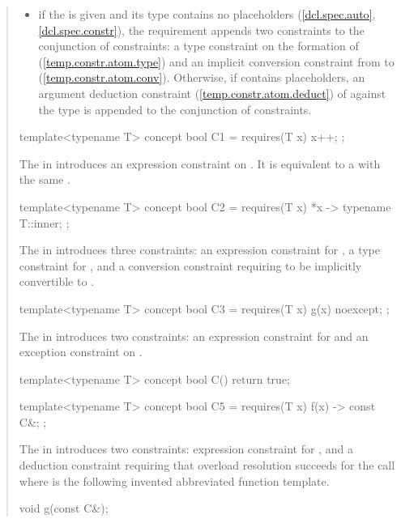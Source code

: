 \begin{quote}
\begin{itemize}
\item if the  is given and its 
type  contains no placeholders (\ref{dcl.spec.auto}, 
\ref{dcl.spec.constr}), the requirement appends two constraints to the 
conjunction of constraints:
a type constraint on the formation of  (\ref{temp.constr.atom.type}) and
an implicit conversion constraint from  to 
(\ref{temp.constr.atom.conv}).
%
Otherwise, if  contains placeholders, an argument deduction 
constraint (\ref{temp.constr.atom.deduct}) of  against the 
type  is appended to the conjunction of constraints.
\end{itemize}
%
\enterexample
\begin{codeblock}
template<typename T> concept bool C1 =
  requires(T x) {
    {x++};
  };
\end{codeblock}
The  in  
introduces an expression constraint on .
It is equivalent to a 
with the same .

\begin{codeblock}
template<typename T> concept bool C2 =
  requires(T x) {
    {*x} -> typename T::inner;
  };
\end{codeblock}

The  in  
introduces three constraints: an expression constraint for , 
a type constraint for , and a conversion 
constraint requiring  to be implicitly convertible to
.

\begin{codeblock}
template<typename T> concept bool C3 =
  requires(T x) {
    {g(x)} noexcept;
  };
\end{codeblock}

The  in  
introduces two constraints: an expression constraint for  
and an exception constraint on .

\begin{codeblock}
template<typename T> concept bool C() { return true; }

template<typename T> concept bool C5 =
  requires(T x) {
    {f(x)} -> const C&;
  };
\end{codeblock}

The  in  
introduces two constraints: expression constraint for , 
and a deduction constraint requiring that overload resolution succeeds for the
call  where  is the following
invented abbreviated function template.
\begin{codeblock}
void g(const C&);
\end{codeblock}
\exitexample


\end{quote}
